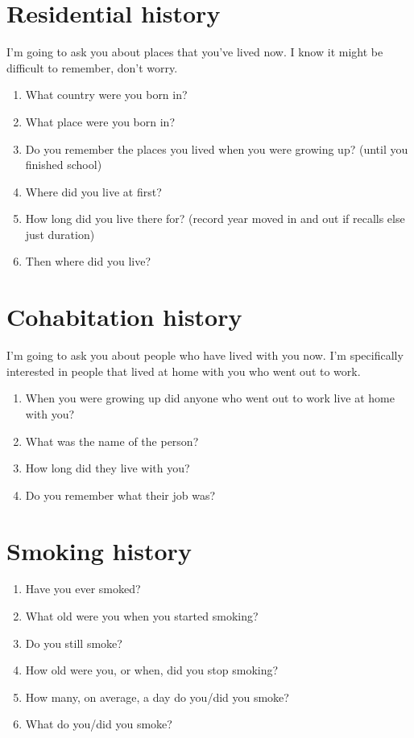 \documentclass[a4paper,10pt]{article}
\begin{document}
\newpage
\section{Residential history}
I'm going to ask you about places that you've lived now. I know it might be difficult to remember, don't worry.

\begin{enumerate}
\item What country were you born in? %
\item What place were you born in? %
\item Do you remember the places you lived when you were growing up? (until you finished school) 
\item Where did you live at first?
\item How long did you live there for? (record year moved in and out if recalls else just duration)
\item Then where did you live?    
\end{enumerate}

\section{Cohabitation history}
I'm going to ask you about people who have lived with you now. I'm specifically interested in people that lived at home with you who went out to work.

\begin{enumerate}
\item When you were growing up did anyone who went out to work live at home with you?
\item What was the name of the person?
\item How long did they live with you?
\item Do you remember what their job was?
\end{enumerate}


\section{Smoking history}

\begin{enumerate}
\item Have you ever smoked?
\item What old were you when you started smoking?
\item Do you still smoke?
\item How old were you, or when, did you stop smoking?
\item How many, on average, a day do you/did you smoke?
\item What do you/did you smoke?
\end{enumerate}
\end{document}
